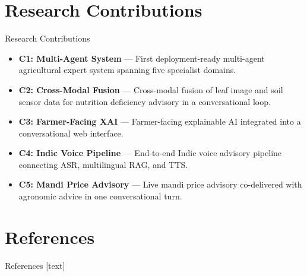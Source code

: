 \documentclass[aspectratio=169, 10pt]{beamer}
\begin{document}
\section{Research Contributions}
\begin{frame}{Research Contributions}
    \small
    \begin{itemize}
        \setlength{\itemsep}{0.8ex}
        \item \textbf{C1: Multi-Agent System} --- First deployment-ready multi-agent agricultural expert system spanning five specialist domains.
        \item \textbf{C2: Cross-Modal Fusion} --- Cross-modal fusion of leaf image and soil sensor data for nutrition deficiency advisory in a conversational loop.
        \item \textbf{C3: Farmer-Facing XAI} --- Farmer-facing explainable AI integrated into a conversational web interface.
        \item \textbf{C4: Indic Voice Pipeline} --- End-to-end Indic voice advisory pipeline connecting ASR, multilingual RAG, and TTS.
        \item \textbf{C5: Mandi Price Advisory} --- Live mandi price advisory co-delivered with agronomic advice in one conversational turn.
    \end{itemize}
\end{frame}

\section{References}
\begin{frame}[allowframebreaks]{References}
    \scriptsize
    [text]
    
    
    \let\oldthebibliography\thebibliography
    \let\endoldthebibliography\endthebibliography
    \renewenvironment{thebibliography}[1]{%
        \begin{oldthebibliography}{#1}%
        \setlength{\itemsep}{0pt}%
        \setlength{\parsep}{0pt}%
    }{%
        \end{oldthebibliography}%
    }
    
    \nocite{*} %
    
\end{frame}
\end{document}
